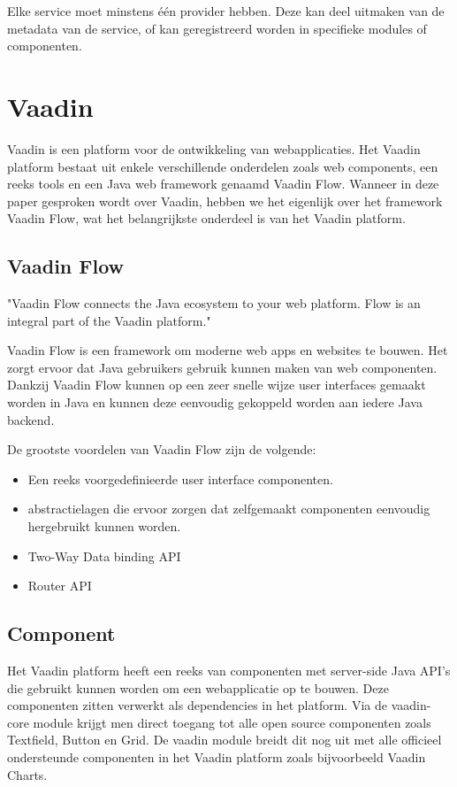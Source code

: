Elke service moet minstens één provider hebben. Deze kan deel uitmaken van de metadata van de service, of kan geregistreerd worden in specifieke modules of componenten. 

\section{Vaadin}
Vaadin is een platform voor de ontwikkeling van webapplicaties. Het Vaadin platform bestaat uit enkele verschillende onderdelen zoals web components, een reeks tools en een Java web framework genaamd Vaadin Flow. Wanneer in deze paper gesproken wordt over Vaadin, hebben we het eigenlijk over het framework Vaadin Flow, wat het belangrijkste onderdeel is van het Vaadin platform. 
\subsection{Vaadin Flow}

"Vaadin Flow connects the Java ecosystem to your web platform. Flow is an integral part of the Vaadin platform." \autocite{Vaadin2019} 

Vaadin Flow is een framework om moderne web apps en websites te bouwen. Het zorgt ervoor dat Java gebruikers gebruik kunnen maken van web componenten. Dankzij Vaadin Flow kunnen op een zeer snelle wijze user interfaces gemaakt worden in Java en kunnen deze eenvoudig gekoppeld worden aan iedere Java backend.

De grootste voordelen van Vaadin Flow zijn de volgende:
\begin{itemize}
	\item Een reeks voorgedefinieerde user interface componenten.
	\item abstractielagen die ervoor zorgen dat zelfgemaakt componenten eenvoudig hergebruikt kunnen worden.
	\item Two-Way Data binding API
	\item Router API
\end{itemize}

\subsection{Component}
Het Vaadin platform heeft een reeks van componenten met server-side Java API's die gebruikt kunnen worden om een webapplicatie op te bouwen. Deze componenten zitten verwerkt als dependencies in het platform. Via de vaadin-core module krijgt men direct toegang tot alle open source componenten zoals Textfield, Button en Grid. De vaadin module breidt dit nog uit met alle officieel ondersteunde componenten in het Vaadin platform zoals bijvoorbeeld Vaadin Charts. 

